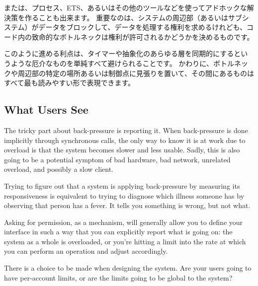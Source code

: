 または、プロセス、ETS、あるいはその他のツールなどを使ってアドホックな解決策を作ることも出来ます。
重要なのは、システムの周辺部（あるいはサブシステム）がデータをブロックして、データを処理する権利を求めるけれども、コード内の致命的なボトルネックは権利が許可されるかどうかを決めるものです。

このように進める利点は、タイマーや抽象化のあらゆる層を同期的にするというような厄介なものを単純すべて避けられることです。
かわりに、ボトルネックや周辺部の特定の場所あるいは制御点に見張りを置いて、その間にあるものはすべて最も読みやすい形で表現できます。

\subsection{What Users See}

The tricky part about back-pressure is reporting it. When back-pressure is done implicitly through synchronous calls, the only way to know it is at work due to overload is that the system becomes slower and less usable. Sadly, this is also going to be a potential symptom of bad hardware, bad network, unrelated overload, and possibly a slow client.

Trying to figure out that a system is applying back-pressure by measuring its responsiveness is equivalent to trying to diagnose which illness someone has by observing that person has a fever. It tells you something is wrong, but not what.

Asking for permission, as a mechanism, will generally allow you to define your interface in such a way that you can explicitly report what is going on: the system as a whole is overloaded, or you're hitting a limit into the rate at which you can perform an operation and adjust accordingly.

There is a choice to be made when designing the system. Are your users going to have per-account limits, or are the limits going to be global to the system?

